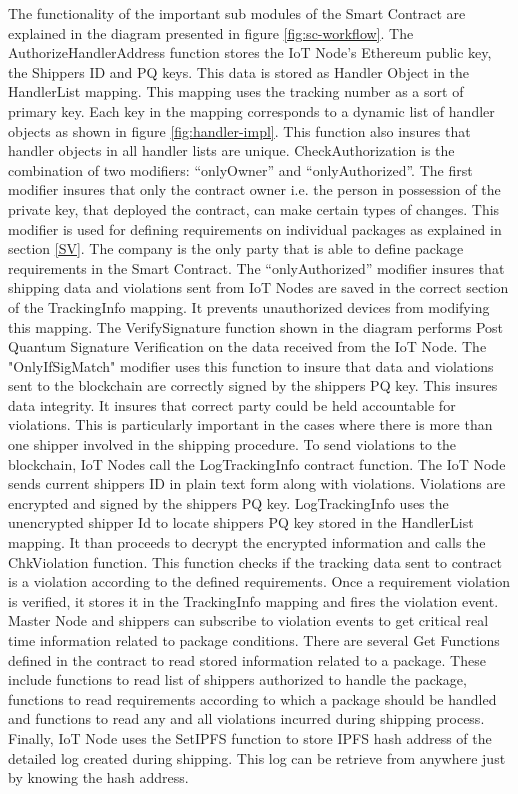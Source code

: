 The functionality of the important sub modules of the Smart Contract are explained in the diagram presented in figure \ref{fig:sc-workflow}. The AuthorizeHandlerAddress function stores the IoT Node’s Ethereum public key, the Shippers ID and PQ keys. This data is stored as Handler Object in the HandlerList mapping. This mapping uses the tracking number as a sort of primary key. Each key in the mapping corresponds to a dynamic list of handler objects as shown in figure \ref{fig:handler-impl}. This function also insures that handler objects in all handler lists are unique. CheckAuthorization is the combination of two modifiers: “onlyOwner” and “onlyAuthorized”. The first modifier insures that only the contract owner i.e. the person in possession of the private key, that deployed the contract, can make certain types of changes. This modifier is used for defining requirements on individual packages as explained in section \ref{SV}. The company is the only party that is able to define package requirements in the Smart Contract. The “onlyAuthorized” modifier insures that shipping data and violations sent from IoT Nodes are saved in the correct section of the TrackingInfo mapping. It prevents unauthorized devices from modifying this mapping. The VerifySignature function shown in the diagram performs Post Quantum Signature Verification on the data received from the IoT Node. The "OnlyIfSigMatch" modifier uses this function to insure that data and violations sent to the blockchain are correctly signed by the shippers PQ key. This insures data integrity. It insures that correct party could be held accountable for violations. This is particularly important in the cases where there is more than one shipper involved in the shipping procedure. To send violations to the blockchain, IoT Nodes call the LogTrackingInfo contract function. The IoT Node sends current shippers ID in plain text form along with violations. Violations are encrypted and signed by the shippers PQ key. LogTrackingInfo uses the unencrypted shipper Id to locate shippers PQ key stored in the HandlerList mapping. It than proceeds to decrypt the encrypted information and calls the ChkViolation function. This function checks if the tracking data sent to contract is a violation according to the defined requirements. Once a requirement violation is verified, it stores it in the TrackingInfo mapping and fires the violation event. Master Node and shippers can subscribe to violation events to get critical real time information related to package conditions. There are several Get Functions defined in the contract to read stored information related to a package. These include functions to read list of shippers authorized to handle the package, functions to read requirements according to which a package should be handled and functions to read any and all violations incurred during shipping process. Finally, IoT Node uses the SetIPFS function to store IPFS hash address of the detailed log created during shipping. This log can be retrieve from anywhere just by knowing the hash address.      
